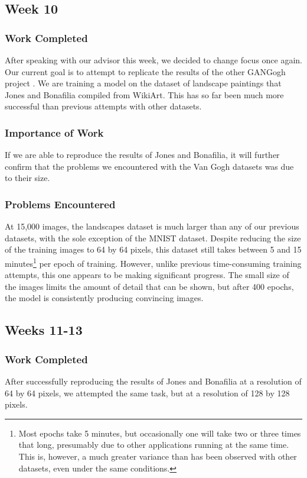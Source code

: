 \documentclass[11pt,letterpaper]{article}
\begin{document}
		\subsection{Week 10}
			\subsubsection{Work Completed}
				After speaking with our advisor this week, we decided to change focus once again.
				Our current goal is to attempt to replicate the results of the other GANGogh project \cite{otherGanGogh}.
				We are training a model on the dataset of landscape paintings that Jones and Bonafilia compiled from WikiArt.
				This has so far been much more successful than previous attempts with other datasets.
			\subsubsection{Importance of Work}
				If we are able to reproduce the results of Jones and Bonafilia, it will further confirm that the problems we encountered with the Van Gogh datasets was due to their size.
			\subsubsection{Problems Encountered}
				At 15,000 images, the landscapes dataset is much larger than any of our previous datasets, with the sole exception of the MNIST dataset.
				Despite reducing the size of the training images to 64 by 64 pixels, this dataset still takes between 5 and 15 minutes\footnote{Most epochs take 5 minutes, but occasionally one will take two or three times that long, presumably due to other applications running at the same time. This is, however, a much greater variance than has been observed with other datasets, even under the same conditions.} per epoch of training.
				However, unlike previous time-consuming training attempts, this one appears to be making significant progress.
				The small size of the images limits the amount of detail that can be shown, but after 400 epochs, the model is consistently producing convincing images.

		\subsection{Weeks 11-13}
			\subsubsection{Work Completed}
				After successfully reproducing the results of Jones and Bonafilia at a resolution of 64 by 64 pixels, we attempted the same task, but at a resolution of 128 by 128 pixels.
\end{document}
